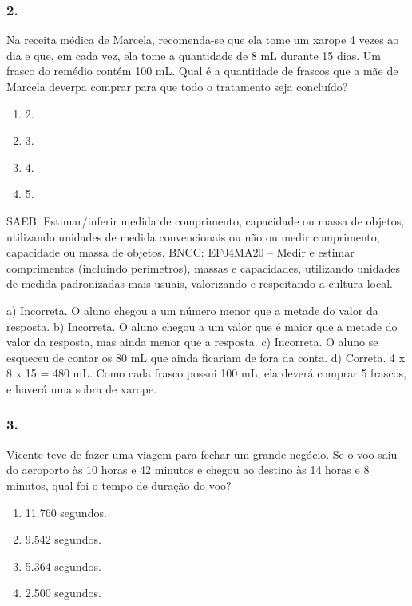 \begin{enumerate}
\begin{escolha}
\begin{enumerate}
\begin{itemize}
\begin{itemize}
\begin{escolha}
\subsubsection{2.}\label{section-50}

Na receita médica de Marcela, recomenda-se que ela tome um xarope 4 vezes ao
dia e que, em cada vez, ela tome a quantidade de 8 mL durante 15 dias. Um
frasco do remédio contém 100 mL. Qual é a quantidade de
frascos que a mãe de Marcela deverpa comprar para que todo o tratamento
seja concluído?

\begin{enumerate}
\def\labelenumi{\alph{enumi})}
\item
  2.
\item
  3.
\item
  4.
\item
  5.
\end{enumerate}

SAEB: Estimar/inferir medida de comprimento, capacidade ou massa de objetos, utilizando unidades de medida convencionais ou não ou medir comprimento, capacidade ou massa de objetos.
BNCC: EF04MA20 -- Medir e estimar comprimentos (incluindo perímetros), massas e capacidades, utilizando
unidades de medida padronizadas mais usuais, valorizando e respeitando a cultura local.

a) Incorreta. O aluno chegou a um número menor que a metade do valor da resposta.
b) Incorreta. O aluno chegou a um valor que é maior que a metade do valor da resposta, mas ainda menor que a resposta.
c) Incorreta. O aluno se esqueceu de contar os 80 mL que ainda ficariam de fora da conta.
d) Correta. 4 x 8 x 15 = 480 mL. Como cada frasco possui 100 mL, ela deverá
comprar 5 frascos, e haverá uma sobra de xarope.

\subsubsection{3.}\label{section-51}

Vicente teve de fazer uma viagem para fechar um grande negócio. Se o voo
saiu do aeroporto às 10 horas e 42 minutos e chegou ao destino às 14
horas e 8 minutos, qual foi o tempo de duração do voo?

\begin{enumerate}
\def\labelenumi{\alph{enumi})}
\item
  11.760 segundos.
\item
  9.542 segundos.
\item
  5.364 segundos.
\item
  2.500 segundos.
\end{enumerate}


\end{escolha}
\end{itemize}
\end{itemize}
\end{enumerate}
\end{escolha}
\end{enumerate}
